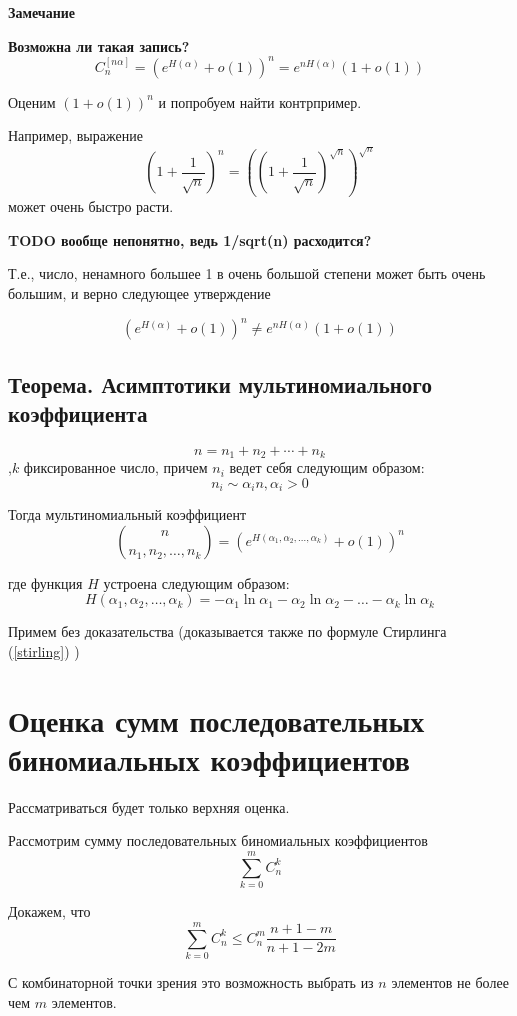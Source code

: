 \textbf{Замечание}

\textbf{Возможна ли такая запись?}
$$
C_{n}^{[n \alpha]} 
= (e^{H(\alpha)} + o(1) )^n
= e^{n H(\alpha)}(1 + o(1) )
$$

Оценим $ (1 + o(1) )^{n} $ и попробуем найти контрпример.

Например, выражение
$$
\left( 1 + \frac{1}{\sqrt{n}} \right)^{n} 
= 
\left( 
\left( 1 + \frac{1}{\sqrt{n}} \right)^{ \sqrt{n} } 
\right)^{ \sqrt{n} } 
$$
может очень быстро расти.

\textbf{TODO вообще непонятно, ведь 1/sqrt(n) расходится?}

Т.е., число, ненамного большее 1 в очень большой степени может быть очень большим, и верно следующее утверждение

$$
(e^{H(\alpha)} + o(1) )^n 
\neq
e^{n H(\alpha)}(1 + o(1) )
$$

\subsection{Теорема. Асимптотики мультиномиального коэффициента}
$$
n = n_1 + n_2 + \cdots + n_k
$$
,$ k $ фиксированное число, причем $ n_i $ ведет себя следующим образом:
$$
n_i \sim \alpha_i n, \alpha_i > 0
$$

Тогда мультиномиальный коэффициент
$$
\binom{n}{n_1, n_2, \ldots, n_k} 
=\left(
e^{H(\alpha_1, \alpha_2, \ldots, \alpha_k)} + o(1)
\right)^{n}
$$

где функция $ H $ устроена следующим образом:
$$
H(\alpha_1, \alpha_2, \ldots, \alpha_k) = 
- \alpha_1 \ln \alpha_1 
- \alpha_2 \ln \alpha_2 
- \ldots
- \alpha_k \ln \alpha_k 
$$

Примем без доказательства (доказывается также по формуле Стирлинга (\ref{stirling}) )

\section{Оценка сумм последовательных биномиальных коэффициентов}

Рассматриваться будет только верхняя оценка.

Рассмотрим сумму последовательных биномиальных коэффициентов
$$
\sum_{k=0}^{m} C_n^k
$$

Докажем, что
$$
\sum\limits_{k=0}^{m} C_n^k 
\le
C_n^m \frac{n+1-m}{n+1-2m}
$$

С комбинаторной точки зрения это возможность выбрать из $ n $ элементов не более чем $ m $ элементов.

